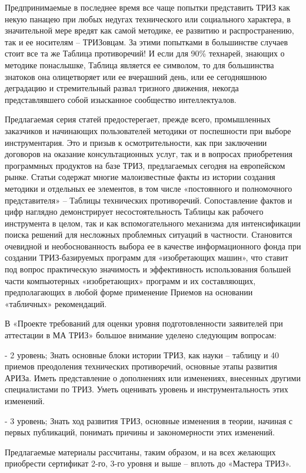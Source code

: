 \documentclass[11pt,a4paper]{article}
\begin{document}
Предпринимаемые в последнее время все чаще попытки представить ТРИЗ как некую
панацею при любых недугах технического или социального характера, в
значительной мере вредят как самой методике, ее развитию и распространению,
так и ее носителям -- ТРИЗовцам. За этими попытками в большинстве случаев
стоит все та же Таблица противоречий! И если для 90\% технарей, знающих о
методике понаслышке, Таблица является ее символом, то для большинства знатоков
она олицетворяет или ее вчерашний день, или ее сегодняшнюю деградацию и
стремительный развал тризного движения, некогда представлявшего собой
изысканное сообщество интеллектуалов.

Предлагаемая серия статей предостерегает, прежде всего, промышленных
заказчиков и начинающих пользователей методики от поспешности при выборе
инструментария. Это и призыв к осмотрительности, как при заключении договоров
на оказание консультационных услуг, так и в вопросах приобретения программных
продуктов на базе ТРИЗ, предлагаемых сегодня на европейском рынке. Статьи
содержат многие малоизвестные факты из истории создания методики и отдельных
ее элементов, в том числе «постоянного и полномочного представителя» --
Таблицы технических противоречий. Сопоставление фактов и цифр наглядно
демонстрирует несостоятельность Таблицы как рабочего инструмента в целом, так
и как вспомогательного механизма для интенсификации поиска решений для
несложных проблемных ситуаций в частности. Становится очевидной и
необоснованность выбора ее в качестве информационного фонда при создании
ТРИЗ-базируемых программ для «изобретающих машин», что ставит под вопрос
практическую значимость и эффективность использования большей части
компьютерных «изобретающих» программ и их составляющих, предполагающих в любой
форме применение Приемов на основании «табличных» рекомендаций.

В «Проекте требований для оценки уровня подготовленности заявителей при
аттестации в МА ТРИЗ» большое внимание уделено следующим вопросам:

- 2 уровень; Знать основные блоки истории ТРИЗ, как науки -- таблицу и 40
приемов преодоления технических противоречий, основные этапы развития
АРИЗа. Иметь представление о дополнениях или изменениях, внесенных другими
специалистами по ТРИЗ. Уметь оценивать уровень и инструментальность этих
изменений.

- 3 уровень; Знать ход развития ТРИЗ, основные изменения в теории, начиная с
первых публикаций, понимать причины и закономерности этих изменений.

Предлагаемые материалы рассчитаны, таким образом, и на всех желающих
приобрести сертификат 2-го, 3-го уровня и выше -- вплоть до «Мастера ТРИЗ».
\end{document}
